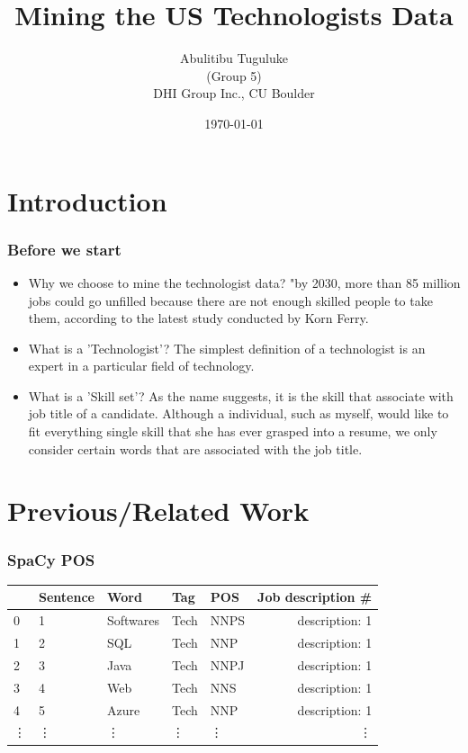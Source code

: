 \documentclass[10pt,mathserif]{beamer}
\title{\large \bfseries Mining the US Technologists Data}
\author{Abulitibu Tuguluke\\[3ex]
(Group 5)\\
	DHI Group Inc., CU Boulder}
\date{\today}
\begin{document}
	
	\frame{
		\thispagestyle{empty}
		\titlepage
	}
	

\section{Introduction} 
	\begin{frame}
	\frametitle{Before we start}
\begin{block}{}
\begin{itemize}
\item Why we choose to mine the technologist data?
 "by 2030, more than 85 million jobs could go unfilled because there are not enough skilled people to take them, according to the latest study conducted by Korn Ferry.
\item What is a  'Technologist'?
The simplest definition of a technologist is an expert in a particular field of technology. 
\item What is a 'Skill set'?
As the name suggests, it is the skill that associate with job title of a candidate. Although a individual, such as myself, would like to fit everything single skill that she has ever grasped into a resume, we only consider certain words that are associated with the job title.
\end{itemize}
\end{block}
\end{frame}
\section{Previous/Related Work}
	\begin{frame}
	\frametitle{SpaCy POS}
{
	\begin{center}
		\begin{tabular}{| l | l | l | l | l | r| } 
			\hline
			&	Sentence	&	Word	&	Tag	 & POS &	Job description \# \\ \hline
			0	&	1	&	Softwares		&Tech	& NNPS	&description: 1 \\ \hline
			1	&	2	&	SQL	&	Tech	& NNP &	description: 1 \\ \hline
			2	&	3	&	Java	&	Tech & NNPJ	&	description: 1	\\ \hline
			3		&4		&Web	&	Tech	& NNS&	description: 1\\ \hline
			4	&	5	&	Azure		&Tech	& NNP	&description: 1\\ \hline
			\vdots	&		\vdots	&		\vdots		&	\vdots	&	\vdots	&	\vdots\\ \hline
		\end{tabular}
\end{center}}

\end{frame}
\end{document}
